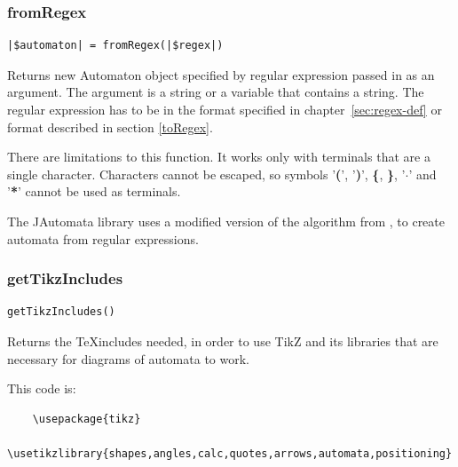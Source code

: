 \documentclass{ctuthesis}
\begin{document}
\subsubsection{fromRegex}
\label{fromRegex}
\begin{lstlisting}[language = JASL_snippet]
	|$automaton| = fromRegex(|$regex|)
\end{lstlisting}

Returns new Automaton object specified by regular expression passed in as an argument. The argument is a string or a variable that contains a string. The regular expression has to be in the format specified in chapter~\ref{sec:regex-def} or format described in section \ref{toRegex}.

There are limitations to this function. It works only with terminals that are a single character. Characters cannot be escaped, so symbols '\textbf{(}', '\textbf{)}', \textbf{\{}, \textbf{\}}, '$\mathbf{\cdot}$' and '\textbf{*}' cannot be used as terminals. 

The JAutomata library uses a modified version of the algorithm from \cite[p.86 algorithm 2.107]{melichar}, to create automata from regular expressions.

\subsubsection{getTikzIncludes}
\label{subsec:getTikzIncludes}
\begin{lstlisting}[language = JASL_snippet]
	getTikzIncludes()
\end{lstlisting}

Returns the \TeX includes needed, in order to use TikZ and its libraries that are necessary for diagrams of automata to work.

This code is:
\begin{verbatim}
	\usepackage{tikz}
	\usetikzlibrary{shapes,angles,calc,quotes,arrows,automata,positioning}
\end{verbatim}
\end{document}
